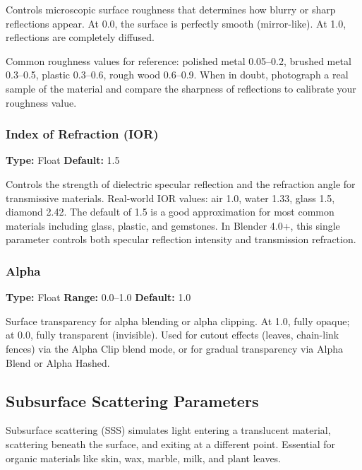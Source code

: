 Controls microscopic surface roughness that determines how blurry or
sharp reflections appear. At 0.0, the surface is perfectly smooth
(mirror-like). At 1.0, reflections are completely diffused.

\begin{tipbox}
Common roughness values for reference: polished metal 0.05--0.2,
brushed metal 0.3--0.5, plastic 0.3--0.6, rough wood 0.6--0.9.
When in doubt, photograph a real sample of the material and compare
the sharpness of reflections to calibrate your roughness value.
\end{tipbox}

\subsubsection{Index of Refraction (IOR)}
\textbf{Type:} Float \quad \textbf{Default:} 1.5

Controls the strength of dielectric specular reflection and the
refraction angle for transmissive materials. Real-world IOR values:
air 1.0, water 1.33, glass 1.5, diamond 2.42. The default of 1.5
is a good approximation for most common materials including glass,
plastic, and gemstones. In Blender 4.0+, this single parameter
controls both specular reflection intensity and transmission
refraction.

\subsubsection{Alpha}
\textbf{Type:} Float \quad \textbf{Range:} 0.0--1.0 \quad
\textbf{Default:} 1.0

Surface transparency for alpha blending or alpha clipping. At 1.0,
fully opaque; at 0.0, fully transparent (invisible). Used for cutout
effects (leaves, chain-link fences) via the Alpha Clip blend mode,
or for gradual transparency via Alpha Blend or Alpha Hashed.

\subsection{Subsurface Scattering Parameters}
\label{sec:shading:principled:sss}

Subsurface scattering (SSS) simulates light entering a translucent
material, scattering beneath the surface, and exiting at a different
point. Essential for organic materials like skin, wax, marble, milk,
and plant leaves.

